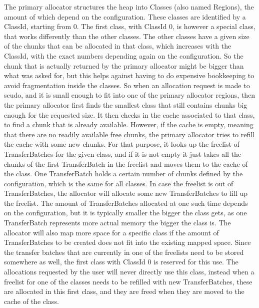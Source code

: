 \documentclass[a4paper,11pt,oneside]{report}
\begin{document}
The primary allocator structures the heap into Classes (also named Regions), the
amount of which depend on the configuration. These classes are identified by a
ClassId, starting from 0. The first class, with ClassId 0, is however a special
class, that works differently than the other classes. 
The other classes have a
given size of the chunks that can be allocated in that class, which increases
with the ClassId, with the exact numbers depending again on the configuration.
So the chunk that is actually returned by the primary allocator might be bigger
than what was asked for, but this helps against having to do expensive bookkeeping
to avoid fragmentation inside the classes.
So when an allocation request is made to scudo, and it is small enough to fit into
one of the primary allocator regions, then the primary allocator first finds the
smallest class that still contains chunks big enough for the requested size. It
then checks in the cache associated to that class, to find a chunk that is already
available. However, if the cache is empty, meaning that there are no readily
available free chunks, the primary allocator tries to refill the cache with some
new chunks. For that purpose, it looks up the freelist of TransferBatches for the
given class, and if it is not empty it just takes all the chunks of the first
TransferBatch in the freelist and moves them to the cache of the class. One
TransferBatch holds a certain number of chunks defined by the configuration,
which is the same for all classes.
In case the freelist is out of TransferBatches, the allocator will allocate
some new TransferBatches to fill up the freelist. The amount of TransferBatches
allocated at one such time depends on the configuration, but it is typically
smaller the bigger the class gets, as one TransferBatch represents more actual
memory the bigger the class is. The allocator will also map more space for a
specific class if the amount of TransferBatches to be created does not fit into
the existing mapped space.
Since the transfer batches that are currently in one of the freelists need to
be stored somewhere as well, the first class with ClassId 0 is reserved for
this use. The allocations requested by the user will never directly use this
class, instead when a freelist for one of the classes needs to be refilled
with new TransferBatches, these are allocated in this first class, and they
are freed when they are moved to the cache of the class.
\end{document}
